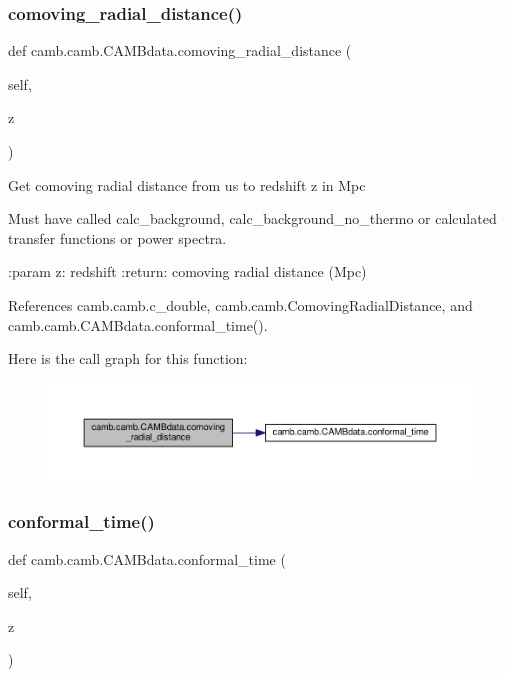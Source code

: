 \subsubsection{\texorpdfstring{comoving\+\_\+radial\+\_\+distance()}{comoving\_radial\_distance()}}
{\footnotesize\ttfamily def camb.\+camb.\+C\+A\+M\+Bdata.\+comoving\+\_\+radial\+\_\+distance (\begin{DoxyParamCaption}\item[{}]{self,  }\item[{}]{z }\end{DoxyParamCaption})}

\begin{DoxyVerb}Get comoving radial distance from us to redshift z in Mpc

Must have called calc_background, calc_background_no_thermo or calculated transfer functions or power spectra.

:param z: redshift
:return: comoving radial distance (Mpc)
\end{DoxyVerb}
 

References camb.\+camb.\+c\+\_\+double, camb.\+camb.\+Comoving\+Radial\+Distance, and camb.\+camb.\+C\+A\+M\+Bdata.\+conformal\+\_\+time().

Here is the call graph for this function\+:
\nopagebreak
\begin{figure}[H]
\begin{center}
\leavevmode
\includegraphics[width=350pt]{classcamb_1_1camb_1_1CAMBdata_af0ce3f135c3734167c4474b63874f89d_cgraph}
\end{center}
\end{figure}
\mbox{\label{classcamb_1_1camb_1_1CAMBdata_a6d9d95cf253bf830576f17763ecc9faa}} 
\subsubsection{\texorpdfstring{conformal\+\_\+time()}{conformal\_time()}}
{\footnotesize\ttfamily def camb.\+camb.\+C\+A\+M\+Bdata.\+conformal\+\_\+time (\begin{DoxyParamCaption}\item[{}]{self,  }\item[{}]{z }\end{DoxyParamCaption})}

